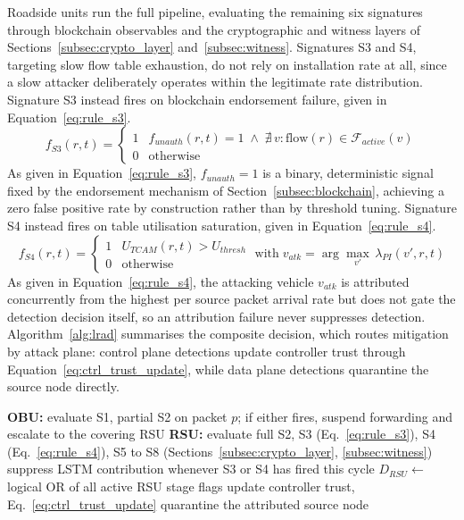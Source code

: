 \documentclass[lettersize,journal]{IEEEtran}
\theoremstyle{plain}
\theoremstyle{remark}
\begin{document}
	Roadside units run the full pipeline, evaluating the remaining six
	signatures through blockchain observables and the cryptographic and
	witness layers of Sections~\ref{subsec:crypto_layer}
	and~\ref{subsec:witness}. Signatures S3 and S4, targeting slow flow
	table exhaustion, do not rely on installation rate at all, since a slow
	attacker deliberately operates within the legitimate rate distribution.
	Signature S3 instead fires on blockchain endorsement failure, given in
	Equation~\eqref{eq:rule_s3}.
	\begin{equation}
		f_{S3}(r,t) =
		\begin{cases}
			1 & f_{unauth}(r,t) = 1
			\;\land\; \nexists\,v :
			\text{flow}(r) \in \mathcal{F}_{active}(v) \\
			0 & \text{otherwise}
		\end{cases}
		\label{eq:rule_s3}
	\end{equation}
	As given in Equation~\eqref{eq:rule_s3}, $f_{unauth}{=}1$ is a binary,
	deterministic signal fixed by the endorsement mechanism of
	Section~\ref{subsec:blockchain}, achieving a zero false positive rate by
	construction rather than by threshold tuning. Signature S4 instead fires
	on table utilisation saturation, given in Equation~\eqref{eq:rule_s4}.
	\begin{equation}
		f_{S4}(r,t) =
		\begin{cases}
			1 & U_{TCAM}(r,t) > U_{thresh} \\
			0 & \text{otherwise}
		\end{cases}
		\;\text{with}\;
		v_{atk} = \arg\max_{v'}\,\lambda_{PI}(v',r,t)
		\label{eq:rule_s4}
	\end{equation}
	As given in Equation~\eqref{eq:rule_s4}, the attacking vehicle $v_{atk}$
	is attributed concurrently from the highest per source packet arrival
	rate but does not gate the detection decision itself, so an attribution
	failure never suppresses detection. Algorithm~\ref{alg:lrad} summarises
	the composite decision, which routes mitigation by attack plane: control
	plane detections update controller trust through
	Equation~\eqref{eq:ctrl_trust_update}, while data plane detections
	quarantine the source node directly.
	\begin{algorithm}[!t]
		\caption{Combined Lightweight and Full Detection}
		\label{alg:lrad}
		\begin{algorithmic}[1]
			\State \textbf{OBU:} evaluate S1, partial S2 on packet $p$; if either fires, suspend forwarding and escalate to the covering RSU
			\State \textbf{RSU:} evaluate full S2, S3 (Eq.~\ref{eq:rule_s3}), S4 (Eq.~\ref{eq:rule_s4}), S5 to S8 (Sections~\ref{subsec:crypto_layer}, \ref{subsec:witness})
			\State suppress LSTM contribution whenever S3 or S4 has fired this cycle
			\State $D_{RSU} \gets$ logical OR of all active RSU stage flags
			\State update controller trust, Eq.~\ref{eq:ctrl_trust_update}
			\State quarantine the attributed source node
			\EndIf
		\end{algorithmic}
	\end{algorithm}
	
\end{document}
